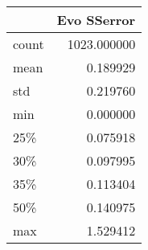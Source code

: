 \begin{tabular}{lr}
\toprule
{} &  Evo SSerror \\
\midrule
count &  1023.000000 \\
mean  &     0.189929 \\
std   &     0.219760 \\
min   &     0.000000 \\
25\%   &     0.075918 \\
30\%   &     0.097995 \\
35\%   &     0.113404 \\
50\%   &     0.140975 \\
max   &     1.529412 \\
\bottomrule
\end{tabular}
